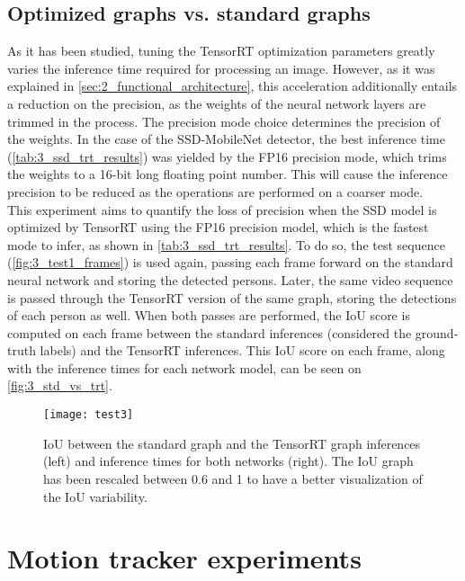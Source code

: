 \vspace{5cm}
\subsection{Optimized graphs vs. standard graphs}

\label{sec:3_test3}
As it has been studied, tuning the TensorRT optimization parameters greatly varies the inference time required for processing an image. However, as it was explained in \autoref{sec:2_functional_architecture}, this acceleration additionally entails a reduction on the precision, as the weights of the neural network layers are trimmed in the process. The precision mode choice determines the precision of the weights. In the case of the SSD-MobileNet detector, the best inference time (\autoref{tab:3_ssd_trt_results}) was yielded by the FP16 precision mode, which trims the weights to a 16-bit long floating point number. This will cause the inference precision to be reduced as the operations are performed on a coarser mode.\\

This experiment aims to quantify the loss of precision when the SSD model is optimized by TensorRT using the FP16 precision model, which is the fastest mode to infer, as shown in \autoref{tab:3_ssd_trt_results}. To do so, the test sequence (\autoref{fig:3_test1_frames}) is used again, passing each frame forward on the standard neural network and storing the detected persons. Later, the same video sequence is passed through the TensorRT version of the same graph, storing the detections of each person as well. When both passes are performed, the IoU score is computed on each frame between the standard inferences (considered the ground-truth labels) and the TensorRT inferences. This IoU score on each frame, along with the inference times for each network model, can be seen on \autoref{fig:3_std_vs_trt}.

\begin{figure}[h]
	\centering
	\texttt{[image: test3]}
	\caption{IoU between the standard graph and the TensorRT graph inferences (left) and inference times for both networks (right). The IoU graph has been rescaled between 0.6 and 1 to have a better visualization of the IoU variability.}
	\label{fig:3_std_vs_trt}
\end{figure}






\section{Motion tracker experiments}

